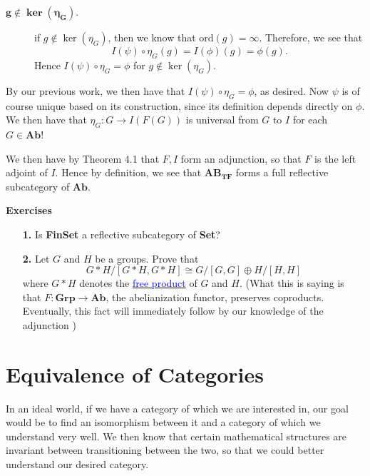 \begin{example}
\begin{description}
            \item[$\bm{g \not\in \ker(\eta_G)}$.]
            if $g \not\in \ker(\eta_G)$, then we know that
            $\text{ord}(g) = \infty$. Therefore, we see that 
            \[
                I(\psi) \circ \eta_G(g) = I(\phi)(g) = \phi(g).
            \] 
            Hence $I(\psi) \circ \eta_G = \phi$ for $g \not\in
            \ker(\eta_G)$. 
        \end{description}
        By our previous work, we then have that $I(\psi) \circ \eta_G
        = \phi$, as desired. Now $\psi$ is of course unique based on
        its construction, since its definition depends directly on
        $\phi$. We then have that $\eta_G: G \to I(F(G))$ is universal
        from $G$ to $I$ for each $G \in \textbf{Ab}$! 

        We then have by Theorem 4.1 that $F, I$ form an adjunction, so
        that $F$ is the left adjoint of $I$. Hence by definition, we
        see that $\textbf{AB}_{\textbf{TF}}$ forms a full reflective
        subcategory of $\textbf{Ab}$.
    \end{example}

    {\large \textbf{Exercises}
    \vspace{0.5cm}}

    \begin{itemize}
        \item[\textbf{1.}] Is \textbf{FinSet} a reflective subcategory of \textbf{Set}?  
        \item[\textbf{2.}]
        Let $G$ and $H$ be a groups. Prove that
        \[
            G*H/[G*H, G*H] \cong G/[G,G]\oplus H/[H,H]
        \] 
        where $G*H$ denotes the \hyperref[example:free_product]{\textcolor{blue}{free product}} 
        of $G$ and $H$.
        (What this is saying is that $F: \textbf{Grp} \to \textbf{Ab}$, the abelianization 
        functor, preserves coproducts. Eventually, this fact will immediately 
        follow by our knowledge of the adjunction ) 
    \end{itemize}
    
    \newpage
    \section{Equivalence of Categories}
    In an ideal world, if we have a category of which we are
    interested in, our goal would be to find an isomorphism between it
    and a category of which we understand very well. We then know that
    certain mathematical structures are invariant between
    transitioning between the two, so that we could better understand
    our desired category. 

